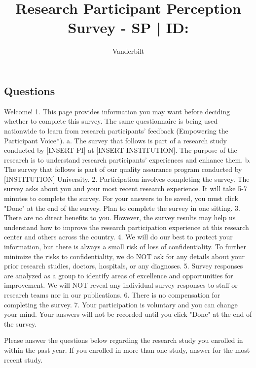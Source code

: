 \documentclass[english,pagemark,stamp,oneside,print_questionnaire_id]{sdapsclassic}
\author{Vanderbilt}
\title{Research Participant Perception Survey - SP | ID: \qid}
\begin{document}
                \begin{questionnaire}
                \begin{Form}
                    
                \section{Questions}
                    \begin{info}
                        Welcome!   1. This page provides information you may want before deciding whether to complete this survey.  The same questionnaire is being used nationwide to learn from research participants' feedback (Empowering the Participant Voice*).    a. The survey that follows is part of a research study conducted by [INSERT PI] at [INSERT INSTITUTION].  The purpose of the research is to understand research participants' experiences and enhance them.       b. The survey that follows is part of our quality assurance program conducted by [INSTITUTION] University.  2. Participation involves completing the survey.  The survey asks about you and your most recent research experience.  It will take 5-7 minutes to complete the survey. For your answers to be saved, you must click "Done" at the end of the survey. Plan to complete the survey in one sitting.  3. There are no direct benefits to you. However, the survey results may help us understand how to improve the research participation experience at this research center and others across the country.   4. We will do our best to protect your information, but there is always a small risk of loss of confidentiality.  To further minimize the risks to confidentiality, we do NOT ask for any details about your prior research studies, doctors, hospitals, or any diagnoses.  5. Survey responses are analyzed as a group to identify areas of excellence and opportunities for improvement. We will NOT reveal any individual survey responses to staff or research teams nor in our publications.   6. There is no compensation for completing the survey.  7. Your participation is voluntary and you can change your mind. Your answers will not be recorded until you click "Done" at the end of the survey.
                    \end{info}
                        \begin{info}
                            Please answer the questions below regarding the research study you enrolled in within the past year. If you enrolled in more than one study, answer for the most recent study.


\end{info}
\end{Form}
\end{questionnaire}
\end{document}

